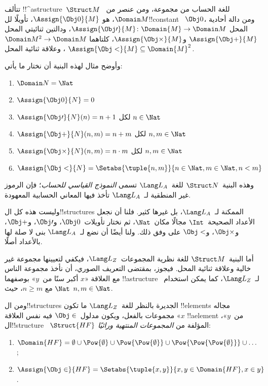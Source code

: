 \documentclass[../../../include/open-logic-section]{subfiles}
\begin{document}
\begin{ex}
تتألف !!^a{structure}~$\Struct M$ للغة الحساب من مجموعة، ومن عنصر
من~$\Domain M$، هو $\Assign{\Obj 0}{M}$، تأويلًا لل!!{constant}
~$\Obj 0$، ومن دالة أحادية المحل
$\Assign{\Obj \prime}{M} \colon \Domain{M} \to \Domain M$،
ودالتين ثنائيتي المحل $\Assign{\Obj +}{M}$ و$\Assign{\Obj
  \times}{M}$، كلتاهما $\Domain M^2 \to \Domain M$، وعلاقة ثنائية
المحل $\Assign{\Obj <}{M} \subseteq \Domain{M}^2$.

وأوضح مثال لهذه البنية أن نختار ما يأتي:
\begin{enumerate}
\item $\Domain N = \Nat$
\item $\Assign{\Obj 0}{N} = 0$
\item $\Assign{\Obj \prime}{N}(n) = n + 1$ لكل $n \in \Nat$
\item $\Assign{\Obj +}{N}(n, m) = n + m$ لكل $n, m \in \Nat$
\item $\Assign{\Obj \times}{N}(n, m) = n\cdot m$ لكل $n, m \in \Nat$
\item $\Assign{\Obj <}{N} = \Setabs{\tuple{n, m}}{n \in \Nat, m \in
  \Nat, n < m}$
\end{enumerate}
وهذه البنية~$\Struct N$ للغة~$\Lang L_A$ تسمى
\emph{النموذج القياسي للحساب}؛ فإن الرموز غير المنطقية
لـ~$\Lang L_A$ تأخذ فيها المعاني الحسابية المعهودة.

وليست هذه كل ال!!{structure}s الممكنة لـ~$\Lang L_A$، بل غيرها كثير.
فلنا أن نجعل الأعداد الصحيحة~$\Int$ مجالًا مكان~$\Nat$، ثم نختار
تأويلات~$\Obj 0$، و$\Obj \prime$، و$\Obj +$، و$\Obj
\times$، و$\Obj <$ على وفق ذلك. ولنا أيضًا أن نضع
لـ~$\Lang L_A$ بنى لا صلة لها بالأعداد أصلًا.
\end{ex}

\begin{ex}
أما البنية~$\Struct M$ للغة نظرية المجموعات~$\Lang L_Z$، فيكفي
لتعيينها مجموعة غير خالية وعلاقة ثنائية المحل. فيجوز، بمقتضى
التعريف الصوري، أن نأخذ مجموعة الناس مع العلاقة «$x$ أكبر سنًا من~$y$»
بوصفهما !!a{structure} لـ~$\Lang L_Z$، كما يمكن استخدام~$\Nat$ مع
$n \ge m$، حيث $n, m \in \Nat$.

ومن ال!!{structure}s الجديرة بالنظر للغة~$\Lang L_Z$ ما تكون
!!{element}s مجاله مجموعات بالفعل، ويكون مدلول~$\Obj \in$
فيه نفس العلاقة «$x$ !!a{element} من~$y$»، ال!!{structure}
~$\Struct{{HF}}$ المؤلفة من \emph{المجموعات المنتهية وراثيًا}:
\begin{enumerate}
\item $\Domain{{{HF}}} = \emptyset \cup \Pow{\emptyset} \cup
  \Pow{\Pow{\emptyset}} \cup \Pow{\Pow{\Pow{\emptyset}}} \cup \dots$;
\item $\Assign{\Obj \in}{{{HF}}} = \Setabs{\tuple{x, y}}{x, y \in
  \Domain{{{HF}}}, x \in y}$.
\end{enumerate}
\end{ex}
\end{document}
